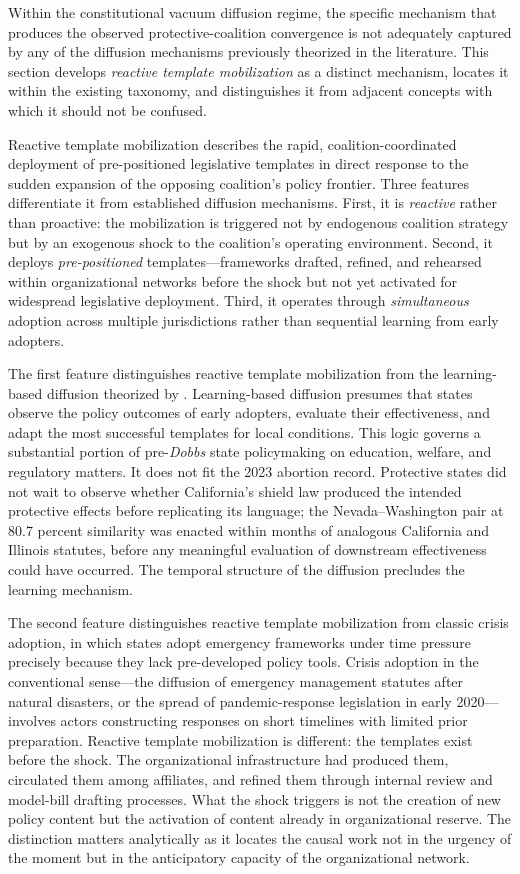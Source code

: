 Within the constitutional vacuum diffusion regime, the specific mechanism that produces the observed protective-coalition convergence is not adequately captured by any of the diffusion mechanisms previously theorized in the literature. This section develops \emph{reactive template mobilization} as a distinct mechanism, locates it within the existing taxonomy, and distinguishes it from adjacent concepts with which it should not be confused. 

Reactive template mobilization describes the rapid, coalition-coordinated deployment of pre-positioned legislative templates in direct response to the sudden expansion of the opposing coalition's policy frontier. Three features differentiate it from established diffusion mechanisms. First, it is \emph{reactive} rather than proactive: the mobilization is triggered not by endogenous coalition strategy but by an exogenous shock to the coalition's operating environment. Second, it deploys \emph{pre-positioned} templates---frameworks drafted, refined, and rehearsed within organizational networks before the shock but not yet activated for widespread legislative deployment. Third, it operates through \emph{simultaneous} adoption across multiple jurisdictions rather than sequential learning from early adopters.

The first feature distinguishes reactive template mobilization from the learning-based diffusion theorized by \textcite{shipanMechanismsPolicyDiffusion2008a}. Learning-based diffusion presumes that states observe the policy outcomes of early adopters, evaluate their effectiveness, and adapt the most successful templates for local conditions. This logic governs a substantial portion of pre-\textit{Dobbs} state policymaking on education, welfare, and regulatory matters. It does not fit the 2023 abortion record. Protective states did not wait to observe whether California's shield law produced the intended protective effects before replicating its language; the Nevada--Washington pair at 80.7 percent similarity was enacted within months of analogous California and Illinois statutes, before any meaningful evaluation of downstream effectiveness could have occurred. The temporal structure of the diffusion precludes the learning mechanism.

The second feature distinguishes reactive template mobilization from classic crisis adoption, in which states adopt emergency frameworks under time pressure precisely because they lack pre-developed policy tools. Crisis adoption in the conventional sense---the diffusion of emergency management statutes after natural disasters, or the spread of pandemic-response legislation in early 2020---involves actors constructing responses on short timelines with limited prior preparation. Reactive template mobilization is different: the templates exist before the shock. The organizational infrastructure had produced them, circulated them among affiliates, and refined them through internal review and model-bill drafting processes. What the shock triggers is not the creation of new policy content but the activation of content already in organizational reserve. The distinction matters analytically as it locates the causal work not in the urgency of the moment but in the anticipatory capacity of the organizational network.

